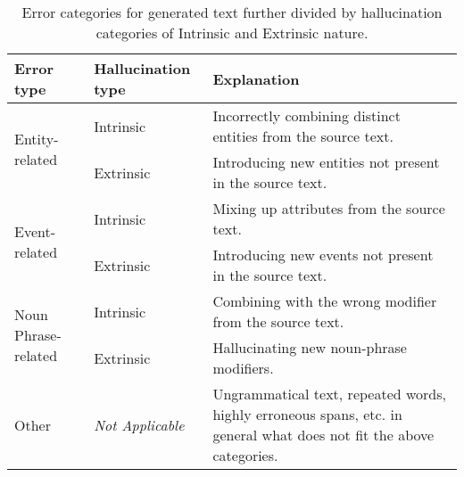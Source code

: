 \begin{table}[ht]
    \small
    \begin{tabular}{p{}  p{}   p{} }
    Error type & Hallucination type & Explanation\\
    \hline
    \multirow{2}{*}{Entity-related}  & Intrinsic & Incorrectly combining distinct entities from the source text.  \\
                                     & Extrinsic & Introducing new entities not present in the source text.   \\[7mm]

    \multirow{2}{*}{Event-related}   & Intrinsic & Mixing up attributes from the source text. \\
                                     & Extrinsic & Introducing new events not present in the source text. \\[7mm]

    \multirow{2}{*}{Noun Phrase-related}  & Intrinsic & Combining with the wrong modifier from the source text. \\
                                         & Extrinsic & Hallucinating new noun-phrase modifiers. \\[5mm]

    Other & \textit{Not Applicable} & Ungrammatical text, repeated words, highly erroneous spans, etc. in general what does not fit the above categories. \\
    \hline
    \end{tabular}
    \caption{Error categories for generated text further divided by hallucination categories of Intrinsic and Extrinsic nature.}
    \label{tab:hallucination_errors}
\end{table}